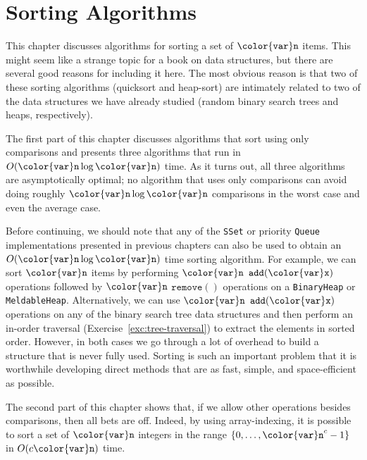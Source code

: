 \documentclass[10pt]{book}
\newcommand{\chaplabel}[1]{\label{chap:#1}}
\theoremstyle{plain}
\theoremstyle{definition}
\newcommand{\excref}[1]{Exercise~\ref{exc:#1}}
\begin{document}
\clearpage

\clearpage
\chapter{Sorting Algorithms}
\chaplabel{sorting}

This chapter discusses algorithms for sorting a set of \ensuremath{\mathtt{{\color{var}n}}} items.
This might seem like a strange topic for a book on data structures, but
there are several good reasons for including it here.  The most obvious
reason is that two of these sorting algorithms (quicksort and heap-sort)
are intimately related to two of the data structures we have already
studied (random binary search trees and heaps, respectively).

The first part of this chapter discusses algorithms that sort using only
comparisons and presents three algorithms that run in $O(\ensuremath{\mathtt{{\color{var}n}}}\log \ensuremath{\mathtt{{\color{var}n}}})$
time.  As it turns out, all three algorithms are asymptotically optimal;
no algorithm that uses only comparisons can avoid doing roughly $\ensuremath{\mathtt{{\color{var}n}}}\log
\ensuremath{\mathtt{{\color{var}n}}}$ comparisons in the worst case and even the average case.

Before continuing, we should note that any of the \texttt{SSet} or priority
\texttt{Queue} implementations presented in previous chapters can also
be used to obtain an $O(\ensuremath{\mathtt{{\color{var}n}}}\log \ensuremath{\mathtt{{\color{var}n}}})$ time sorting algorithm.
For example, we can sort \ensuremath{\mathtt{{\color{var}n}}} items by performing \ensuremath{\mathtt{{\color{var}n}}} \ensuremath{\mathtt{add({\color{var}x})}}
operations followed by \ensuremath{\mathtt{{\color{var}n}}} \ensuremath{\mathtt{remove()}} operations on a \texttt{BinaryHeap}
or \texttt{MeldableHeap}. Alternatively, we can use \ensuremath{\mathtt{{\color{var}n}}} \ensuremath{\mathtt{add({\color{var}x})}} operations
on any of the binary search tree data structures and then perform an
in-order traversal (\excref{tree-traversal}) to extract the elements in
sorted order.  However, in both cases we go through a lot of overhead to
build a structure that is never fully used.  Sorting is such an important
problem that it is worthwhile developing direct methods that are as fast,
simple, and space-efficient as possible.

The second part of this chapter shows that, if we allow other
operations besides comparisons, then all bets are off.  Indeed, by using
array-indexing, it is possible to sort a set of \ensuremath{\mathtt{{\color{var}n}}} integers in the range
$\{0,\ldots,\ensuremath{\mathtt{{\color{var}n}}}^c-1\}$ in $O(c\ensuremath{\mathtt{{\color{var}n}}})$ time.
\end{document}
